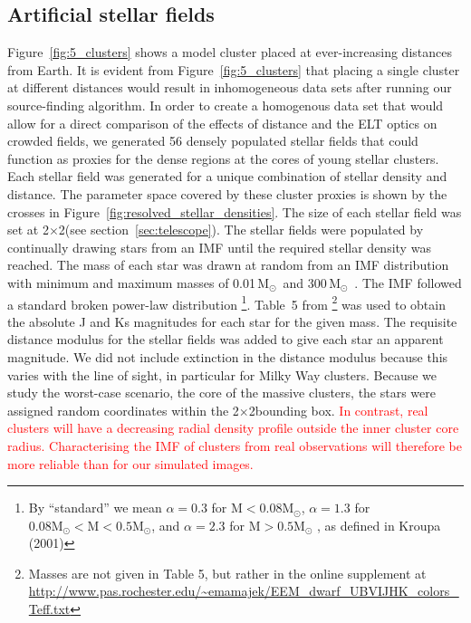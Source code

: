 \documentclass{aa}
\newcommand{\msun}{M$_\odot$~}
\newcommand{\langedit}[1]{\textcolor{red}{#1}}
\begin{document}
\subsection{Artificial stellar fields}
  \label{subsec:stellar_fields}
Figure~\ref{fig:5_clusters} shows a model cluster placed at ever-increasing distances from Earth.
It is evident from Figure~\ref{fig:5_clusters} that placing a single cluster at different distances would result in inhomogeneous data sets after running our source-finding algorithm.
In order to create a homogenous data set that would allow for a direct comparison of the effects of distance and the ELT optics on crowded fields, we generated 56 densely populated stellar fields that could function as proxies for the dense regions at the cores of young stellar clusters.
Each stellar field was generated for a unique combination of stellar density and distance.
The parameter space covered by these cluster proxies is shown by the crosses in Figure~\ref{fig:resolved_stellar_densities}.
The size of each stellar field was set at 2\arcsec$\times$2\arcsec (see section~\ref{sec:telescope}).
The stellar fields were populated by continually drawing stars from an IMF until the required stellar density was reached.
The mass of each star was drawn at random from an IMF distribution with minimum and maximum masses of 0.01\,\msun and 300\,\msun.
The IMF followed a standard \citet{kroupa2001} broken power-law distribution
\footnote{By ``standard'' we mean $\alpha=0.3$ for $\mathrm{M} < 0.08 \mathrm{M}_\odot$, $\alpha=1.3$ for $0.08\mathrm{M}_\odot < \mathrm{M} < 0.5 \mathrm{M}_\odot$, and $\alpha=2.3$ for $\mathrm{M} > 0.5 \mathrm{M}_\odot$ , as defined in Kroupa (2001)}.
Table~5 from \citet{pecaut2013}\footnote{Masses are not given in Table 5, but rather in the online supplement at \url{http://www.pas.rochester.edu/~emamajek/EEM_dwarf_UBVIJHK_colors_Teff.txt}}
was used to obtain the absolute J and Ks magnitudes for each star for the given mass.
The requisite distance modulus for the stellar fields was added to give each star an apparent magnitude.
We did not include extinction in the distance modulus because this varies with the line of sight, in particular for Milky Way clusters.
Because we study the worst-case scenario, the core of the massive clusters, the stars were assigned random coordinates within the 2\arcsec$\times$2\arcsec bounding box.
\langedit{In contrast, real clusters will have a decreasing radial density profile outside the inner cluster core radius.
Characterising the IMF of clusters from real observations will therefore be more reliable than for our simulated images.}
\end{document}
